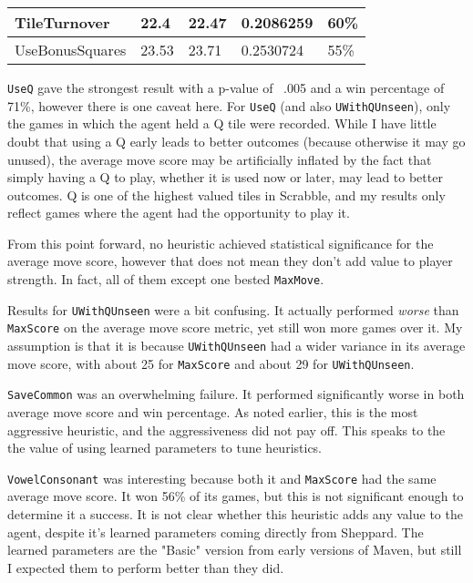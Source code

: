 \documentclass[letterpaper]{article}
\begin{document}
\begin{table}[h]
\begin{tabular}{|l|l|l|l|l|}
TileTurnover    & 22.4                                                          & 22.47                                                            & 0.2086259        & 60\%                                                               \\ \hline
UseBonusSquares & 23.53                                                         & 23.71                                                            & 0.2530724        & 55\%                                                               \\ \hline
\end{tabular}
\end{table}

\texttt{UseQ} gave the strongest result with a p-value of ~.005 and a win percentage of 71\%, however there is one caveat here. For \texttt{UseQ} (and also \texttt{UWithQUnseen}), only the games in which the agent held a Q tile were recorded. While I have little doubt that using a Q early leads to better outcomes (because otherwise it may go unused), the average move score may be artificially inflated by the fact that simply having a Q to play, whether it is used now or later,  may lead to better outcomes. Q is one of the highest valued tiles in Scrabble, and my results only reflect games where the agent had the opportunity to play it.

From this point forward, no heuristic achieved statistical significance for the average move score, however that does not mean they don't add value to player strength. In fact, all of them except one bested \texttt{MaxMove}.

Results for \texttt{UWithQUnseen} were a bit confusing. It actually performed \emph{worse} than \texttt{MaxScore} on the average move score metric, yet still won more games over it. My assumption is that it is because \texttt{UWithQUnseen} had a wider variance in its average move score, with about 25 for \texttt{MaxScore} and about 29 for \texttt{UWithQUnseen}.

\texttt{SaveCommon} was an overwhelming failure. It performed significantly worse in both average move score and win percentage. As noted earlier, this is the most aggressive heuristic, and the aggressiveness did not pay off. This speaks to the the value of using learned parameters to tune heuristics.

\texttt{VowelConsonant} was interesting because both it and \texttt{MaxScore} had the same average move score. It won 56\% of its games, but this is not significant enough to determine it a success. It is not clear whether this heuristic adds any value to the agent, despite it's learned parameters coming directly from Sheppard. The learned parameters are the "Basic" version from early versions of Maven, but still I expected them to perform better than they did.
\end{document}
